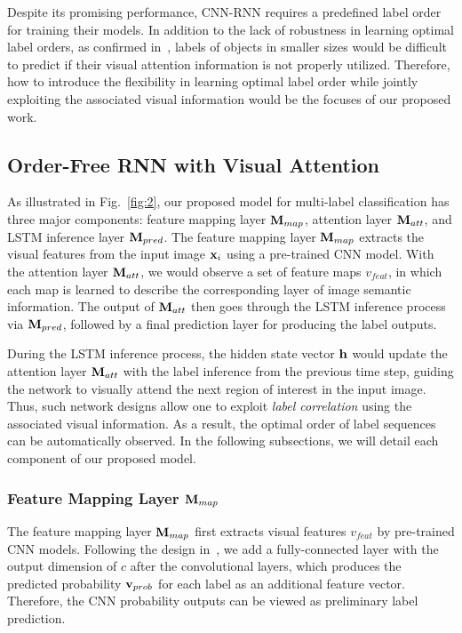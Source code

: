 \documentclass[letterpaper]{article} %
\begin{document}
Despite its promising performance, CNN-RNN requires a predefined label order for training their models. In addition to the lack of robustness in learning optimal label orders, as confirmed in~\cite{wang2016cnn}, labels of objects in smaller sizes would be difficult to predict if their visual attention information is not properly utilized. Therefore, how to introduce the flexibility in learning optimal label order while jointly exploiting the associated visual information would be the focuses of our proposed work.

\subsection{Order-Free RNN with Visual Attention}
As illustrated in Fig.~\ref{fig:2}, our proposed model for multi-label classification has three major components: feature mapping layer $\mathbf{M}_{map}$, attention layer $\mathbf{M}_{att}$, and LSTM inference layer $\mathbf{M}_{pred}$. The feature mapping layer $\mathbf{M}_{map}$ extracts the visual features from the input image $\textbf{x}_i$ using a pre-trained CNN model. With the attention layer $\mathbf{M}_{att}$, we would observe a set of feature maps $v_{feat}$, in which each map is learned to describe the corresponding layer of image semantic information. The output of $\mathbf{M}_{att}$ then goes through the LSTM inference process via $\mathbf{M}_{pred}$, followed by a final prediction layer for producing the label outputs.

During the LSTM inference process, the hidden state vector $\mathbf{h}$ would update the attention layer $\mathbf{M}_{att}$ with the label inference from the previous time step, guiding the network to visually attend the next region of interest in the input image. Thus, such network designs allow one to exploit \emph{label correlation} using the associated visual information. As a result, the optimal order of label sequences can be automatically observed. In the following subsections, we will detail each component of our proposed model.\\

\subsubsection{Feature Mapping Layer $\mathbf{M}_{map}$}

The feature mapping layer $\mathbf{M}_{map}$ first extracts visual features $v_{feat}$ by pre-trained CNN models. Following the design in~\cite{liu2016semantic}, we add a fully-connected layer with the output dimension of $c$ after the convolutional layers, which produces the predicted probability $\mathbf{v}_{prob}$ for each label as an additional feature vector. Therefore, the CNN probability outputs can be viewed as preliminary label prediction.
\end{document}
